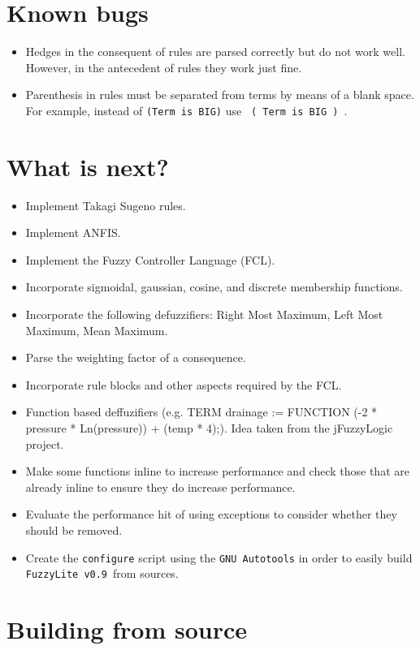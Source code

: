 \documentclass[11pt, final, a4paper]{article}
\newcommand{\fl}{\texttt{FuzzyLite v0.9}}
\begin{document}
	\section{Known bugs}
	\begin{itemize}
		\item Hedges in the consequent of rules are parsed correctly but do not work well. However, in the antecedent of rules they work just fine.
		\item Parenthesis in rules must be separated from terms by means of a blank space. For example, instead of \texttt{(Term is BIG)} use \texttt{ ( Term is BIG ) }. 
		\end{itemize}

	\section{What is next?}
		\begin{itemize}
			\item Implement Takagi Sugeno rules.
			\item Implement ANFIS.
			\item Implement the Fuzzy Controller Language (FCL).
			\item Incorporate sigmoidal, gaussian, cosine, and discrete membership functions.
			\item Incorporate the following defuzzifiers: Right Most Maximum, Left Most Maximum, Mean Maximum.
			\item Parse the weighting factor of a consequence.
			\item Incorporate rule blocks and other aspects required by the FCL.
			\item Function based deffuzifiers (e.g. TERM drainage := FUNCTION (-2 * pressure * Ln(pressure)) + (temp * 4);). Idea taken from the jFuzzyLogic project.
			
			\item Make some functions inline to increase performance and check those that are already inline to ensure they do increase performance.
			\item Evaluate the performance hit of using exceptions to consider whether they should be removed.
			\item Create the \texttt{configure} script using the \texttt{GNU Autotools} in order to easily build \fl\ from sources.
		\end{itemize}
		
	\section{Building from source}
\end{document}
